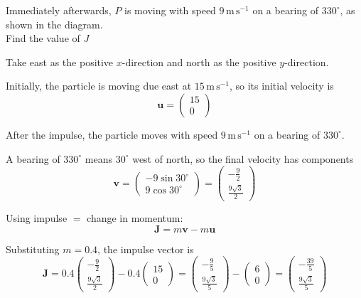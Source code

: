 \documentclass[leqno]{article}
\begin{document}
\begin{enumerate}[
  label=\textbf{\arabic*.},
  leftmargin=*,
  topsep=0pt,
  partopsep=0pt,
  parsep=0pt
]
Immediately afterwards, $P$ is moving with speed $9\,\mathrm{m\,s^{-1}}$ on a bearing of $330^\circ$, as shown in the diagram. \\

Find the value of $J$ 

\vspace*{10pt}

\begin{djsSolution}
Take east as the positive \(x\)-direction and north as the positive \(y\)-direction.

Initially, the particle is moving due east at \(15\,\mathrm{m\,s^{-1}}\), so its initial velocity is
\[
\mathbf{u}=\begin{pmatrix}15\\0\end{pmatrix}
\]

After the impulse, the particle moves with speed \(9\,\mathrm{m\,s^{-1}}\) on a bearing of \(330^\circ\).

A bearing of \(330^\circ\) means \(30^\circ\) west of north, so the final velocity has components
\[
\mathbf{v}=
\begin{pmatrix}
-9\sin30^\circ\\[2mm]
9\cos30^\circ
\end{pmatrix}
=
\begin{pmatrix}
-\frac{9}{2}\\[2mm]
\frac{9\sqrt3}{2}
\end{pmatrix}
\]

Using impulse \(=\) change in momentum:
\[
\mathbf{J}=m\mathbf{v}-m\mathbf{u}
\]

Substituting \(m=0.4\), the impulse vector is
\[
\mathbf{J}
=0.4\begin{pmatrix}
-\frac{9}{2}\\[2mm]
\frac{9\sqrt3}{2}
\end{pmatrix}
-0.4\begin{pmatrix}
15\\0
\end{pmatrix}
=
\begin{pmatrix}
-\frac{9}{5}\\[2mm]
\frac{9\sqrt3}{5}
\end{pmatrix}
-
\begin{pmatrix}
6\\0
\end{pmatrix}
=
\begin{pmatrix}
-\frac{39}{5}\\[2mm]
\frac{9\sqrt3}{5}
\end{pmatrix}
\]


\end{djsSolution}
\end{enumerate}
\end{document}
